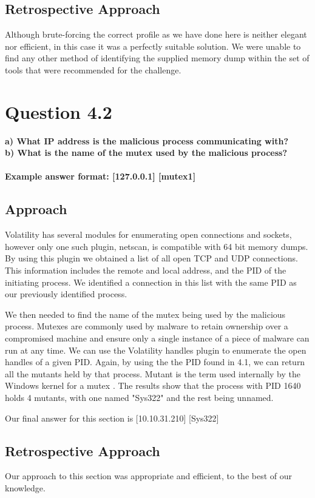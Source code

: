 \subsection{Retrospective Approach}
Although brute-forcing the correct profile as we have done here is neither elegant nor efficient, in this case it was a perfectly suitable solution. We were unable to find any other method of identifying the supplied memory dump within the set of tools that were recommended for the challenge.
\section{Question 4.2}
\textbf{a) What IP address is the malicious process communicating with?
\\b) What is the name of the mutex used by the malicious process?
\\\\
Example answer format: [127.0.0.1] [mutex1]}
\subsection{Approach}

Volatility has several modules for enumerating open connections and sockets, however only one such plugin, netscan, is compatible with 64 bit memory dumps. By using this plugin we obtained a list of all open TCP and UDP connections. This information includes the remote and local address, and the PID of the initiating process. We identified a connection in this list with the same PID as our previously identified process. 

We then needed to find the name of the mutex being used by the malicious process. Mutexes are commonly used by malware to retain ownership over a compromised machine and ensure only a single instance of a piece of malware can run at any time. We can use the Volatility handles plugin to enumerate the open handles of a given PID. Again, by using the the PID found in 4.1, we can return all the mutants held by that process. Mutant is the term used internally by the Windows kernel for a mutex \cite[p.57]{winint}. The results show that the process with PID 1640 holds 4 mutants, with one named "Sys322" and the rest being unnamed.

Our final answer for this section is [10.10.31.210] [Sys322]

\subsection{Retrospective Approach}
Our approach to this section was appropriate and efficient, to the best of our knowledge.
